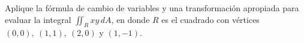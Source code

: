 \item Aplique la fórmula de cambio de variables y una transformación apropiada para evaluar la integral $\iint_R xy \, dA$, en donde $R$ es el cuadrado con vértices $(0, 0), \ (1, 1), \ (2, 0)$ y $(1, -1)$.
